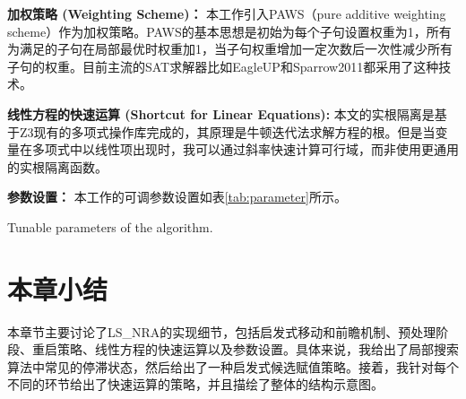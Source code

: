 \textbf{加权策略 (Weighting Scheme)：} 本工作引入PAWS（pure additive weighting scheme）\cite{PAWS}作为加权策略。PAWS的基本思想是初始为每个子句设置权重为1，所有为满足的子句在局部最优时权重加1，当子句权重增加一定次数后一次性减少所有子句的权重。目前主流的SAT求解器比如EagleUP\cite{eagleup}和Sparrow2011\cite{sparrow}都采用了这种技术。

\textbf{线性方程的快速运算 (Shortcut for Linear Equations):} 本文的实根隔离是基于Z3现有的多项式操作库完成的，其原理是牛顿迭代法求解方程的根。但是当变量在多项式中以线性项出现时，我可以通过斜率快速计算可行域，而非使用更通用的实根隔离函数。

\textbf{参数设置：} 本工作的可调参数设置如表\ref{tab:parameter}所示。

\begin{table}[]
    \centering
         {Tunable parameters of the algorithm.}
\label{tab:parameter}
\end{table}

\section{本章小结}
本章节主要讨论了LS\_NRA的实现细节，包括启发式移动和前瞻机制、预处理阶段、重启策略、线性方程的快速运算以及参数设置。具体来说，我给出了局部搜索算法中常见的停滞状态，然后给出了一种启发式候选赋值策略。接着，我针对每个不同的环节给出了快速运算的策略，并且描绘了整体的结构示意图。
